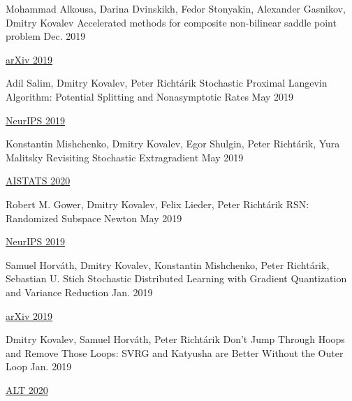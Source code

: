 \begin{cventries}
\cventry
{Mohammad Alkousa, Darina Dvinskikh, Fedor Stonyakin, Alexander Gasnikov, Dmitry Kovalev} %
{Accelerated methods for composite non-bilinear saddle point problem} %
{} %
{Dec. 2019} %
{ %
	\begin{cvitems}
		\item {\href{https://arxiv.org/abs/1906.03620}{arXiv 2019}}
	\end{cvitems}
}	

\cventry
{Adil Salim, Dmitry Kovalev, Peter Richtárik} %
{Stochastic Proximal Langevin Algorithm: Potential Splitting and Nonasymptotic Rates} %
{} %
{May 2019} %
{ %
	\begin{cvitems}
		\item {\href{https://papers.nips.cc/paper/8891-stochastic-proximal-langevin-algorithm-potential-splitting-and-nonasymptotic-rates}{NeurIPS 2019}}
	\end{cvitems}
}	
	
\cventry
{Konstantin Mishchenko, Dmitry Kovalev, Egor Shulgin, Peter Richtárik, Yura Malitsky} %
{Revisiting Stochastic Extragradient} %
{} %
{May 2019} %
{ %
	\begin{cvitems}
		\item {\href{http://proceedings.mlr.press/v108/mishchenko20a}{AISTATS 2020}}
	\end{cvitems}
}

\cventry
{Robert M. Gower, Dmitry Kovalev, Felix Lieder, Peter Richtárik} %
{RSN: Randomized Subspace Newton} %
{} %
{May 2019} %
{ %
	\begin{cvitems}
		\item {\href{https://papers.nips.cc/paper/8351-rsn-randomized-subspace-newton}{NeurIPS 2019}}
	\end{cvitems}
}

\cventry
{Samuel Horváth, Dmitry Kovalev, Konstantin Mishchenko, Peter Richtárik, Sebastian U. Stich} %
{Stochastic Distributed Learning with Gradient Quantization and Variance Reduction} %
{} %
{Jan. 2019} %
{ %
	\begin{cvitems}
		\item {\href{https://arxiv.org/abs/1904.05115}{arXiv 2019}}
	\end{cvitems}
}

\cventry
{Dmitry Kovalev, Samuel Horváth, Peter Richtárik} %
{Don't Jump Through Hoops and Remove Those Loops: SVRG and Katyusha are Better Without the Outer Loop} %
{} %
{Jan. 2019} %
{ %
	\begin{cvitems}
		\item {\href{http://proceedings.mlr.press/v117/kovalev20a}{ALT 2020}}
	\end{cvitems}
}



\end{cventries}
